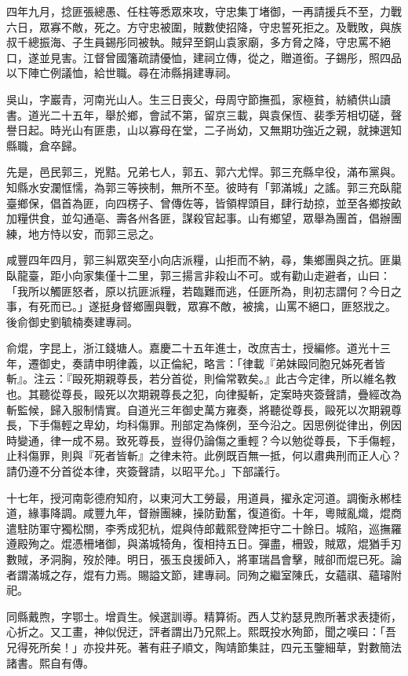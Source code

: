 \begin{pinyinscope}
四年九月，捻匪張總愚、任柱等悉眾來攻，守忠集丁堵御，一再請援兵不至，力戰六日，眾寡不敵，死之。方守忠被圍，賊數使招降，守忠誓死拒之。及戰敗，與族叔千總振海、子生員錫彤同被執。賊舁至銅山袁家廟，多方脅之降，守忠罵不絕口，遂並見害。江督曾國籓疏請優恤，建祠立傳，從之，贈道銜。子錫彤，照四品以下陣亡例議恤，給世職。尋在沛縣捐建專祠。

吳山，字巖青，河南光山人。生三日喪父，母周守節撫孤，家極貧，紡績供山讀書。道光二十五年，舉於鄉，會試不第，留京三載，與袁保恆、裴季芳相切磋，聲譽日起。時光山有匪患，山以寡母在堂，二子尚幼，又無期功強近之親，就揀選知縣職，倉卒歸。

先是，邑民郭三，兇黠。兄弟七人，郭五、郭六尤悍。郭三充縣皁役，滿布黨與。知縣水安瀾恇懦，為郭三等挾制，無所不至。彼時有「郭滿城」之謠。郭三充臥龍臺鄉保，倡首為匪，向四楞子、曾傳佐等，皆領桿頭目，肆行劫掠，並至各鄉按畝加糧供食，並勾通亳、壽各州各匪，謀殺官起事。山有鄉望，眾舉為團首，倡辦團練，地方恃以安，而郭三忌之。

咸豐四年四月，郭三糾眾突至小向店派糧，山拒而不納，尋，集鄉團與之抗。匪巢臥龍臺，距小向家集僅十二里，郭三揚言非殺山不可。或有勸山走避者，山曰：「我所以觸匪怒者，原以抗匪派糧，若臨難而逃，任匪所為，則初志謂何？今日之事，有死而已。」遂挺身督鄉團與戰，眾寡不敵，被擒，山罵不絕口，匪怒戕之。後俞御史劉毓楠奏建專祠。

俞焜，字昆上，浙江錢塘人。嘉慶二十五年進士，改庶吉士，授編修。道光十三年，遷御史，奏請申明律義，以正倫紀，略言：「律載『弟妹毆同胞兄姊死者皆斬』。注云：『毆死期親尊長，若分首從，則倫常斁矣。』此古今定律，所以維名教也。其聽從尊長，毆死以次期親尊長之犯，向律擬斬，定案時夾簽聲請，疊經改為斬監候，歸入服制情實。自道光三年御史萬方雍奏，將聽從尊長，毆死以次期親尊長，下手傷輕之卑幼，均科傷罪。刑部定為條例，至今沿之。因思例從律出，例因時變通，律一成不易。致死尊長，豈得仍論傷之重輕？今以勉從尊長，下手傷輕，止科傷罪，則與『死者皆斬』之律未符。此例既百無一抵，何以肅典刑而正人心？請仍遵不分首從本律，夾簽聲請，以昭平允。」下部議行。

十七年，授河南彰德府知府，以東河大工勞最，用道員，擢永定河道。調衡永郴桂道，緣事降調。咸豐九年，督辦團練，操防勤奮，復道銜。十年，粵賊亂熾，焜商遣駐防軍守獨松關，李秀成犯杭，焜與侍郎戴熙登陴拒守二十餘日。城陷，巡撫羅遵殿殉之。焜憑柵堵御，與滿城犄角，復相持五日。彈盡，柵毀，賊眾，焜猶手刃數賊，矛洞胸，歿於陣。明日，張玉良援師入，將軍瑞昌會擊，賊卻而焜已死。論者謂滿城之存，焜有力焉。賜謚文節，建專祠。同殉之繼室陳氏，女蘊祺、蘊璿附祀。

同縣戴煦，字鄂士。增貢生。候選訓導。精算術。西人艾約瑟見煦所著求表捷術，心折之。又工畫，神似倪迂，評者謂出乃兄熙上。熙既投水殉節，聞之嘆曰：「吾兄得死所矣！」亦投井死。著有莊子順文，陶靖節集註，四元玉鑒細草，對數簡法諸書。熙自有傳。


\end{pinyinscope}
